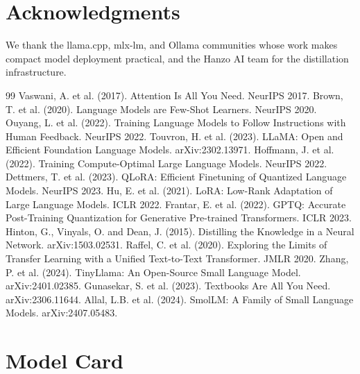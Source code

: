 \documentclass[11pt,a4paper]{article}
\begin{document}
\section*{Acknowledgments}

We thank the llama.cpp, mlx-lm, and Ollama communities whose work makes compact model
deployment practical, and the Hanzo AI team for the distillation infrastructure.

\begin{thebibliography}{99}
 Vaswani, A. et al. (2017). Attention Is All You Need. NeurIPS 2017.
 Brown, T. et al. (2020). Language Models are Few-Shot Learners. NeurIPS 2020.
 Ouyang, L. et al. (2022). Training Language Models to Follow Instructions with Human Feedback. NeurIPS 2022.
 Touvron, H. et al. (2023). LLaMA: Open and Efficient Foundation Language Models. arXiv:2302.13971.
 Hoffmann, J. et al. (2022). Training Compute-Optimal Large Language Models. NeurIPS 2022.
 Dettmers, T. et al. (2023). QLoRA: Efficient Finetuning of Quantized Language Models. NeurIPS 2023.
 Hu, E. et al. (2021). LoRA: Low-Rank Adaptation of Large Language Models. ICLR 2022.
 Frantar, E. et al. (2022). GPTQ: Accurate Post-Training Quantization for Generative Pre-trained Transformers. ICLR 2023.
 Hinton, G., Vinyals, O. and Dean, J. (2015). Distilling the Knowledge in a Neural Network. arXiv:1503.02531.
 Raffel, C. et al. (2020). Exploring the Limits of Transfer Learning with a Unified Text-to-Text Transformer. JMLR 2020.
 Zhang, P. et al. (2024). TinyLlama: An Open-Source Small Language Model. arXiv:2401.02385.
 Gunasekar, S. et al. (2023). Textbooks Are All You Need. arXiv:2306.11644.
 Allal, L.B. et al. (2024). SmolLM: A Family of Small Language Models. arXiv:2407.05483.
\end{thebibliography}

\appendix

\section{Model Card}
\end{document}
